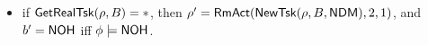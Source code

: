 {\begin{itemize}
\begin{itemize}
\begin{itemize}
\begin{itemize}
        			\end{itemize}
	\end{itemize}
        \item if $\mathsf{GetRealTsk}(\rho,B) = *$, then $\rho'=\mathsf{RmAct}(\mathsf{NewTsk}(\rho, B, {\sf NDM}), 2, 1)$, and $b' = {\sf NOH}$ iff $\phi \models {\sf NOH}$.
    \end{itemize}
\end{itemize}    

\smallskip
\noindent \fbox{$\phi \models \ntkflag \wedge \neg \ndmflag$}

}
